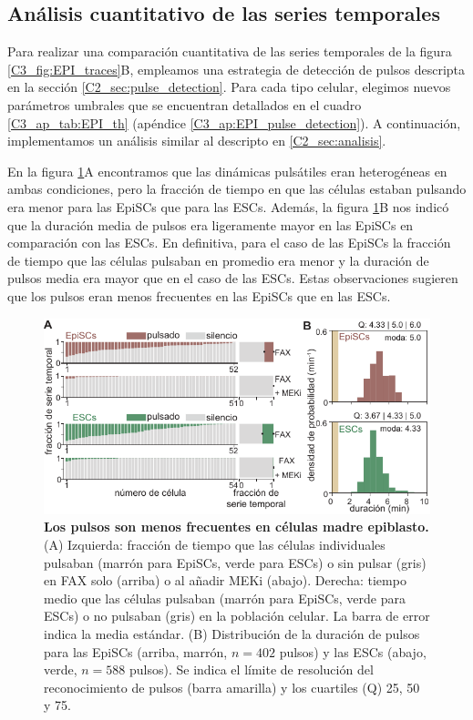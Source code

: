 \documentclass[./main.tex]{subfiles}
\begin{document}
\subsection{Análisis cuantitativo de las series temporales}

Para realizar una comparación cuantitativa de las series temporales de la figura \ref{C3_fig:EPI_traces}B, empleamos una estrategia de detección de pulsos descripta en la sección \ref{C2_sec:pulse_detection}. Para cada tipo celular, elegimos nuevos parámetros umbrales que se encuentran detallados en el cuadro \ref{C3_ap_tab:EPI_th} (apéndice \ref{C3_ap:EPI_pulse_detection}). A continuación, implementamos un análisis similar al descripto en \ref{C2_sec:analisis}. 


En la figura \ref{C3_fig:EPI_activity}A encontramos que las dinámicas pulsátiles eran heterogéneas en ambas condiciones, pero la fracción de tiempo en que las células estaban pulsando era menor para las EpiSCs que para las ESCs. Además, la figura \ref{C3_fig:EPI_activity}B nos indicó que la duración media de pulsos era ligeramente mayor en las EpiSCs en comparación con las ESCs. En definitiva, para el caso de las EpiSCs la fracción de tiempo que las células pulsaban en promedio era menor y la duración de pulsos media era mayor que en el caso de las ESCs. Estas observaciones sugieren que los pulsos eran menos frecuentes en las EpiSCs que en las ESCs. 

\begin{figure}
    \centering
    \includegraphics[width=1\columnwidth]{figures/chapter3/C3_EpiSC_activity.pdf} \caption{\textbf{Los pulsos son menos frecuentes en células madre epiblasto.} (A) Izquierda: fracción de tiempo que las células individuales pulsaban (marrón para EpiSCs, verde para ESCs) o sin pulsar (gris) en FAX solo (arriba) o al añadir MEKi (abajo). Derecha: tiempo medio que las células pulsaban (marrón para EpiSCs, verde para ESCs) o no pulsaban (gris) en la población celular. La barra de error indica la media estándar. (B) Distribución de la duración de pulsos para las EpiSCs (arriba, marrón, $n = 402$ pulsos) y las ESCs (abajo, verde, $n = 588$ pulsos). Se indica el límite de resolución del reconocimiento de pulsos (barra amarilla) y los cuartiles (Q) 25, 50 y 75.}
    \label{C3_fig:EPI_activity}
\end{figure}
\end{document}
